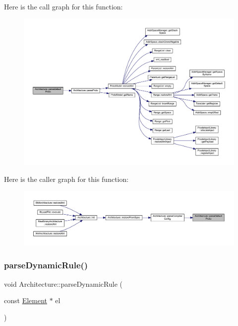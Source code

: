 Here is the call graph for this function\+:
\nopagebreak
\begin{figure}[H]
\begin{center}
\leavevmode
\includegraphics[width=350pt]{class_architecture_a1ea36f2638d65351dd00ba06fe0dc00b_cgraph}
\end{center}
\end{figure}
Here is the caller graph for this function\+:
\nopagebreak
\begin{figure}[H]
\begin{center}
\leavevmode
\includegraphics[width=350pt]{class_architecture_a1ea36f2638d65351dd00ba06fe0dc00b_icgraph}
\end{center}
\end{figure}
\mbox{\label{class_architecture_aef6b370b90db6fbf3a8b8b62740c77ba}} 
\subsubsection{\texorpdfstring{parseDynamicRule()}{parseDynamicRule()}}
{\footnotesize\ttfamily void Architecture\+::parse\+Dynamic\+Rule (\begin{DoxyParamCaption}\item[{const \mbox{\hyperlink{class_element}{Element}} $\ast$}]{el }\end{DoxyParamCaption})\hspace{0.3cm}{\ttfamily [protected]}}



